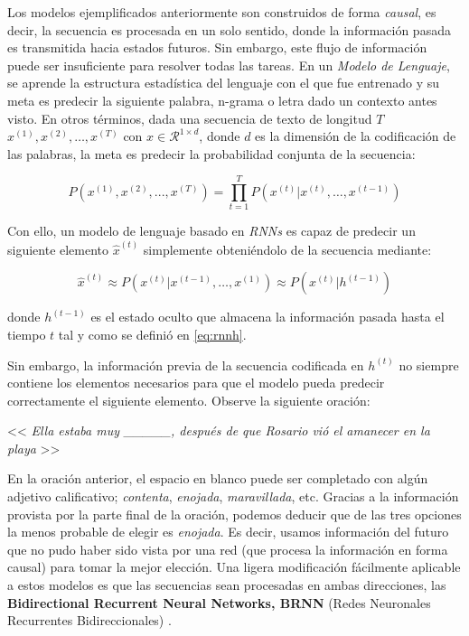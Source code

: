 Los modelos ejemplificados anteriormente son construidos de forma \textit{causal}, es
decir, la secuencia es procesada en un solo sentido, donde la información pasada es transmitida
hacia estados futuros. Sin embargo, este flujo de información puede ser insuficiente para resolver
todas las tareas. En un \textit{Modelo de Lenguaje}, se aprende la estructura estadística del lenguaje con el
que fue entrenado y su meta es predecir la siguiente palabra, n-grama o letra dado un contexto antes
visto. En otros términos, dada una secuencia de texto de longitud
$T$ $x^{(1)}, x^{(2)}, \ldots, x^{(T)}$
con $x \in \mathcal{R}^{1 \times d}$, donde $d$ es la dimensión de la codificación de las palabras,
la meta es predecir la probabilidad conjunta de la secuencia:


\begin{equation}
    P(x^{(1)}, x^{(2)}, ..., x^{(T)}) = \prod_{t=1}^{T} P(x^{(t)} | x^{(t)}, \dots , x^{(t-1)})
\end{equation}

Con ello, un modelo de lenguaje basado en \textit{RNNs} es capaz de predecir
un siguiente elemento $\hat x^{(t)}$ simplemente obteniéndolo de la secuencia mediante:

\begin{equation}
    \hat x^{(t)} \approx P(x^{(t)} | x^{(t-1)}, \dots, x^{(1)}) \approx P(x^{(t)} | h^{(t-1)})
\end{equation}

\noindent donde $h^{(t-1)}$ es el estado oculto que almacena la información pasada hasta el tiempo $t$
tal y como se definió en \ref{eq:rnnh}.

Sin embargo, la información previa de la secuencia codificada en $h^{(t)}$ no siempre contiene los
elementos necesarios para que el modelo pueda predecir correctamente el siguiente elemento.
Observe la siguiente oración:


\begin{center}
    << \textit{Ella estaba muy \_\_\_\_\_, después de que Rosario vió el amanecer en la playa } >>
\end{center}

\noindent En la oración anterior, el espacio en blanco puede ser completado con algún adjetivo calificativo;
\textit{contenta}, \textit{enojada}, \textit{maravillada}, etc. Gracias a la información provista por
la parte final de la oración, podemos deducir que de las tres opciones la menos probable de
elegir es \textit{enojada}. Es decir, usamos información del futuro que no pudo haber sido vista por
una red (que procesa la información en forma causal) para tomar la mejor elección. Una ligera
modificación fácilmente aplicable a estos modelos es que las secuencias sean procesadas
en ambas direcciones, las \textbf{Bidirectional Recurrent Neural Networks, BRNN} (Redes Neuronales
Recurrentes Bidireccionales) \cite{Schuster}.

